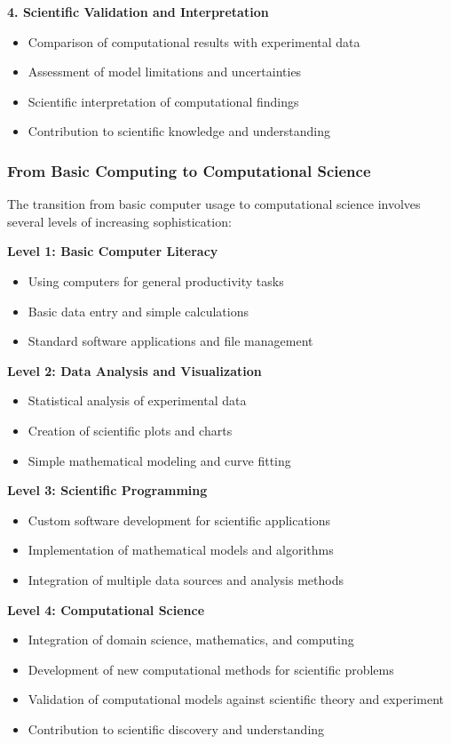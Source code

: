 \textbf{4. Scientific Validation and Interpretation}
\begin{itemize}
    \item Comparison of computational results with experimental data
    \item Assessment of model limitations and uncertainties
    \item Scientific interpretation of computational findings
    \item Contribution to scientific knowledge and understanding
\end{itemize}

\subsubsection{From Basic Computing to Computational Science}

The transition from basic computer usage to computational science involves several levels of increasing sophistication:

\textbf{Level 1: Basic Computer Literacy}
\begin{itemize}
    \item Using computers for general productivity tasks
    \item Basic data entry and simple calculations
    \item Standard software applications and file management
\end{itemize}

\textbf{Level 2: Data Analysis and Visualization}
\begin{itemize}
    \item Statistical analysis of experimental data
    \item Creation of scientific plots and charts
    \item Simple mathematical modeling and curve fitting
\end{itemize}

\textbf{Level 3: Scientific Programming}
\begin{itemize}
    \item Custom software development for scientific applications
    \item Implementation of mathematical models and algorithms
    \item Integration of multiple data sources and analysis methods
\end{itemize}

\textbf{Level 4: Computational Science}
\begin{itemize}
    \item Integration of domain science, mathematics, and computing
    \item Development of new computational methods for scientific problems
    \item Validation of computational models against scientific theory and experiment
    \item Contribution to scientific discovery and understanding
\end{itemize}

